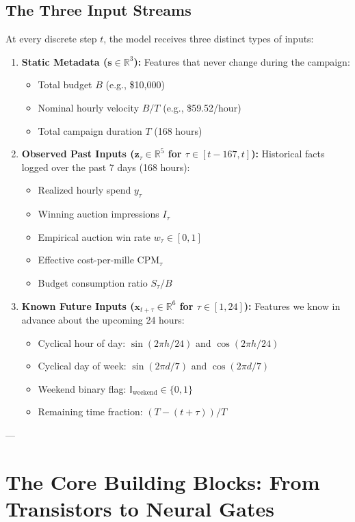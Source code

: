 \documentclass[11pt,a4paper]{article}
\begin{document}
\subsection{The Three Input Streams}
At every discrete step $t$, the model receives three distinct types of inputs:
\begin{enumerate}
    \item \textbf{Static Metadata ($\mathbf{s} \in \mathbb{R}^3$):} Features that never change during the campaign:
    \begin{itemize}
        \item Total budget $B$ (e.g., \$10,000)
        \item Nominal hourly velocity $B/T$ (e.g., \$59.52/hour)
        \item Total campaign duration $T$ (168 hours)
    \end{itemize}
    \item \textbf{Observed Past Inputs ($\mathbf{z}_\tau \in \mathbb{R}^5$ for $\tau \in [t-167, t]$):} Historical facts logged over the past 7 days (168 hours):
    \begin{itemize}
        \item Realized hourly spend $y_\tau$
        \item Winning auction impressions $I_\tau$
        \item Empirical auction win rate $w_\tau \in [0, 1]$
        \item Effective cost-per-mille $\text{CPM}_\tau$
        \item Budget consumption ratio $S_\tau / B$
    \end{itemize}
    \item \textbf{Known Future Inputs ($\mathbf{x}_{t+\tau} \in \mathbb{R}^6$ for $\tau \in [1, 24]$):} Features we know in advance about the upcoming 24 hours:
    \begin{itemize}
        \item Cyclical hour of day: $\sin(2\pi h / 24)$ and $\cos(2\pi h / 24)$
        \item Cyclical day of week: $\sin(2\pi d / 7)$ and $\cos(2\pi d / 7)$
        \item Weekend binary flag: $\mathbb{I}_{\text{weekend}} \in \{0, 1\}$
        \item Remaining time fraction: $(T - (t+\tau)) / T$
    \end{itemize}
\end{enumerate}

---

\section{The Core Building Blocks: From Transistors to Neural Gates}
\end{document}
